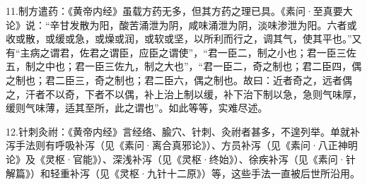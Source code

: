 \documentclass[a4paper,12pt,UTF8,twoside]{ctexbook}
\begin{document}
11.制方遣药：《黄帝内经》虽载方药无多，但其方药之理已具。《素问·至真要大论》说：“辛甘发散为阳，酸苦涌泄为阴，咸味涌泄为阴，淡味渗泄为阳。六者或收或散，或缓或急，或燥或润，或软或坚，以所利而行之，调其气，使其平也。”又有“主病之谓君，佐君之谓臣，应臣之谓使”，“君一臣二，制之小也；君一臣三佐五，制之中也；君一臣三佐九，制之大也”，“君一臣二，奇之制也；君二臣四，偶之制也；君二臣三，奇之制也；君二臣六，偶之制也。故曰：近者奇之，远者偶之，汗者不以奇，下者不以偶，补上治上制以缓，补下治下制以急，急则气味厚，缓则气味薄，适其至所，此之谓也”。如此等等，实难尽述。

12.针刺灸祔：《黄帝内经》言经络、腧穴、针刺、灸祔者甚多，不遑列举。单就补泻手法则有呼吸补泻（见《素问·离合真邪论》）、方员补泻（见《素问·八正神明论》及《灵枢·官能》）、深浅补泻（见《灵枢·终始》）、徐疾补泻（见《素问·针解篇》）和轻重补泻（见《灵枢·九针十二原》）等，这些手法一直被后世所沿用。

\mainmatter
\end{document}
